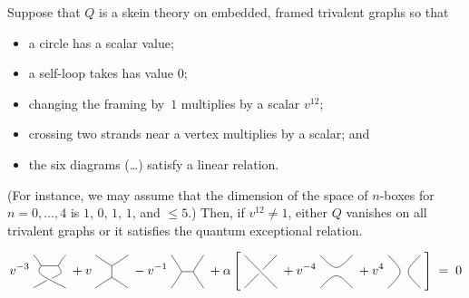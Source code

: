 \documentclass[12pt]{amsart}
\begin{document}
\begin{theorem}
  Suppose that $Q$ is a skein theory on embedded, framed trivalent graphs so that
  \begin{itemize}
  \item a circle has a scalar value;
  \item a self-loop takes has value $0$;
  \item changing the framing by~$1$ multiplies by a scalar $v^{12}$;
  \item crossing two strands near a vertex multiplies by a scalar; and
  \item the six diagrams (\dots) satisfy a linear relation.
  \end{itemize}
  (For instance, we may assume that the dimension of the space of
  $n$-boxes for $n=0,\dots,4$ is $1$, $0$, $1$, $1$, and $\le 5$.)
  Then, if $v^{12} \ne 1$, either $Q$ vanishes on all trivalent graphs
  or it satisfies the quantum exceptional relation.
\end{theorem}


\[
v^{-3} \;
\drawcrossX
\;+ v \;
\drawI
\; -v^{-1} \;
 \drawH
\;
 + \alpha
\left[\; \braidcross \;
 + v^{-4}\;
\twostrandid
\; + v^{4} \;
 \cupcap \;
 \right] \; = \; 0
\]
\end{document}
